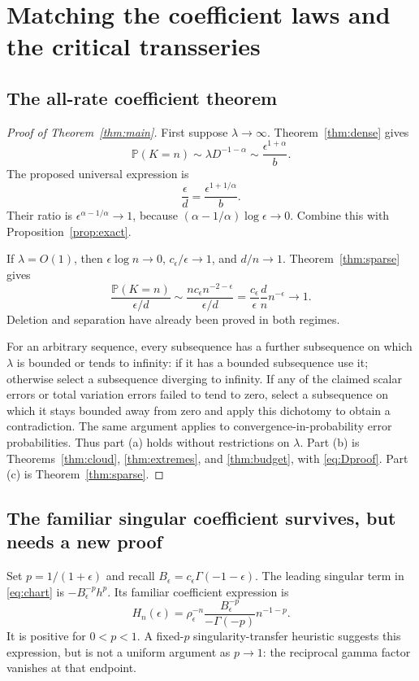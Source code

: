 \documentclass[11pt,a4paper]{article}
\numberwithin{equation}{section}
\theoremstyle{definition}
\theoremstyle{remark}
\newcommand{\Prob}{\mathbb P}
\newcommand{\ee}{\epsilon}
\begin{document}
\section{Matching the coefficient laws and the critical transseries}
\label{sec:matching}

\subsection{The all-rate coefficient theorem}
\begin{proof}[Proof of Theorem~\ref{thm:main}]
First suppose $\lambda\to\infty$. Theorem~\ref{thm:dense} gives
\[
 \Prob(K=n)\sim\lambda D^{-1-\alpha}
   \sim\frac{\ee^{1+\alpha}}b.
\]
The proposed universal expression is
\[
 \frac\ee d=\frac{\ee^{1+1/\alpha}}b.
\]
Their ratio is $\ee^{\alpha-1/\alpha}\to1$, because
$(\alpha-1/\alpha)\log\ee\to0$. Combine this with
Proposition~\ref{prop:exact}.

If $\lambda=O(1)$, then $\ee\log n\to0$, $c_\ee/\ee\to1$, and
$d/n\to1$. Theorem~\ref{thm:sparse} gives
\[
 \frac{\Prob(K=n)}{\ee/d}
 \sim\frac{nc_\ee n^{-2-\ee}}{\ee/d}
 =\frac{c_\ee}{\ee}\frac dn n^{-\ee}\longrightarrow1.
\]
Deletion and separation have already been proved in both regimes.

For an arbitrary sequence, every subsequence has a further subsequence
on which $\lambda$ is bounded or tends to infinity: if it has a bounded
subsequence use it; otherwise select a subsequence diverging to infinity.
If any of the claimed scalar errors or total variation errors failed to
tend to zero, select a subsequence on which it stays bounded away from
zero and apply this dichotomy to obtain a contradiction. The same
argument applies to convergence-in-probability error probabilities.
Thus part (a) holds without restrictions on $\lambda$.
Part (b) is Theorems~\ref{thm:cloud}, \ref{thm:extremes}, and
\ref{thm:budget}, with \eqref{eq:Dproof}. Part (c) is
Theorem~\ref{thm:sparse}.
\end{proof}

\subsection{The familiar singular coefficient survives, but needs a new proof}
Set $p=1/(1+\ee)$ and recall $B_\ee=c_\ee\Gamma(-1-\ee)$.
The leading singular term in \eqref{eq:chart} is
$-B_\ee^{-p}h^p$. Its familiar coefficient expression is
\begin{equation}\label{eq:hahncoefficient}
 H_n(\ee)=\rho_\ee^{-n}
          \frac{B_\ee^{-p}}{-\Gamma(-p)}n^{-1-p}.
\end{equation}
It is positive for $0<p<1$. A fixed-$p$ singularity-transfer heuristic
suggests this expression, but is not a uniform argument as $p\to1$:
the reciprocal gamma factor vanishes at that endpoint.
\end{document}
